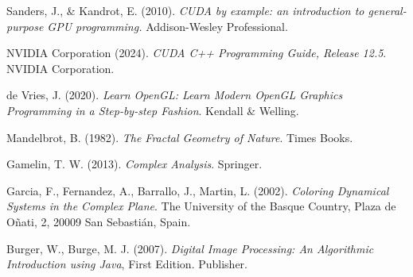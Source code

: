 \begin{thebibliography}{9}

Sanders, J., \& Kandrot, E. (2010). \emph{CUDA by example: an introduction to general-purpose GPU programming.} Addison-Wesley Professional.

NVIDIA Corporation (2024). \emph{CUDA C++ Programming Guide, Release 12.5}. NVIDIA Corporation.


de Vries, J. (2020). \emph{Learn OpenGL: Learn Modern OpenGL Graphics Programming in a Step-by-step Fashion}. Kendall \& Welling.

Mandelbrot, B. (1982). \emph{The Fractal Geometry of Nature}. Times Books.

Gamelin, T. W. (2013). \emph{Complex Analysis}. Springer.

Garcia, F., Fernandez, A., Barrallo, J., Martin, L. (2002). \emph{Coloring Dynamical Systems in the Complex Plane}. The University of the Basque Country, Plaza de Oñati, 2, 20009 San Sebastián, Spain.

Burger, W., Burge, M. J. (2007). \emph{Digital Image Processing: An Algorithmic Introduction using Java}, First Edition. Publisher.


\end{thebibliography}

